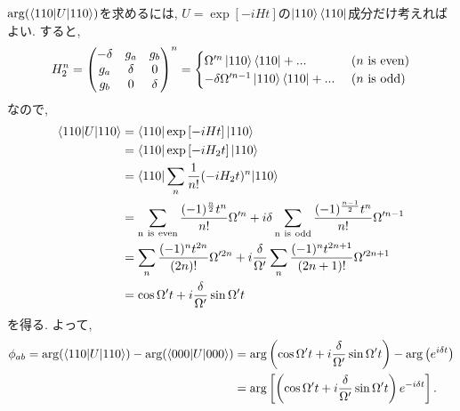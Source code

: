 \begin{ex}
    \label{ex7.21}
    $\arg(\braket{110|U|110})$を求めるには, $U = \exp\left[ - i H t\right]$の$\ket{110}\bra{110}$成分だけ考えればよい. すると,
    \begin{align*}
        H_2^n
        =
        \begin{pmatrix}
            -\delta & g_a    & g_b    \\
            g_a     & \delta & 0      \\
            g_b     & 0      & \delta
        \end{pmatrix}^n
        =
        \begin{cases}
            \Omega'^{n} \ket{110}\bra{110} + ...\             & (n \mathrm{\ is\ even}) \\
            - \delta \Omega'^{n-1} \ket{110}\bra{110} + ...\  & (n \mathrm{\ is\ odd})
        \end{cases}
    \end{align*}
    なので,
    \begin{align*}
        \braket{110|U|110}
         & =
        \braket{110|\exp\left[ - i H t\right]|110}
        \\
         & =
        \braket{110|\exp\left[ - i H_2 t\right]|110}
        \\
         & =
        \braket{ 110|\sum_n \frac{1}{n!} (-i H_2 t)^n |110}
        \\
         & =
        \sum_{\mathrm{n\ is \ even}}
        \frac{(-1)^\frac{n}{2} t^n}{n!}
        \Omega'^{n}
        + i \delta
        \sum_{\mathrm{n\ is \ odd}}
        \frac{(-1)^\frac{n-1}{2} t^{n}}{n!}
        \Omega'^{n-1}
        \\
         & =
        \sum_{n}
        \frac{(-1)^n t^{2n}}{(2n)!}
        \Omega'^{2n}
        + i
        \frac{\delta}{\Omega'}
        \sum_{n}
        \frac{(-1)^n t^{2n+1}}{(2n+1)!}
        \Omega'^{2n+1}
        \\
         & =
        \cos\Omega' t + i \frac{\delta}{\Omega'} \sin\Omega't
    \end{align*}
    を得る. よって,
    \begin{align*}
        \phi_{ab} = \arg(\braket{110|U|110}) - \arg(\braket{000|U|000})
         & =\arg\left(\cos\Omega' t + i \frac{\delta}{\Omega'} \sin\Omega't \right) - \arg\left(e^{i \delta t}\right) \\
         & =
        \arg\left[\left(\cos\Omega' t + i \frac{\delta}{\Omega'} \sin\Omega't \right)e^{- i \delta t} \right].
    \end{align*}

\end{ex}
